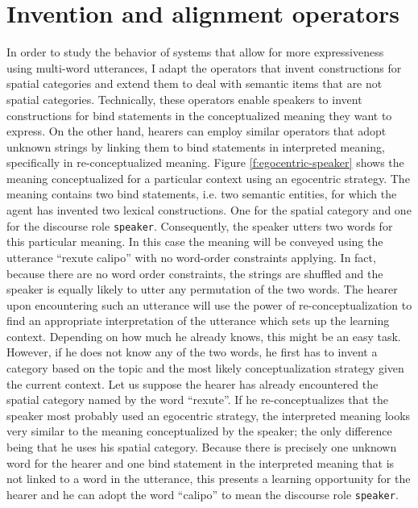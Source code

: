 \section{Invention and alignment operators}
In order to study the behavior of systems that allow for more expressiveness using 
multi-word utterances, I adapt the operators that invent constructions for spatial categories 
and extend them to deal with semantic items that are not spatial categories. 
Technically, these operators enable speakers to invent constructions for bind statements in the 
conceptualized meaning they want to express. On the other hand, hearers can employ 
similar operators that adopt unknown strings by linking them to bind statements in 
interpreted meaning, specifically in re-conceptualized meaning. 
Figure \ref{f:egocentric-speaker} shows the 
meaning conceptualized for a particular context using an egocentric strategy. The
meaning contains two bind statements, i.e. two semantic entities, for which the agent
has invented two lexical constructions. One for the spatial category and
one for the discourse role {\footnotesize\tt speaker}. Consequently, the speaker
utters two words for this particular meaning. In this case the meaning will be conveyed 
using the utterance ``rexute calipo'' with no word-order constraints applying. 
In fact, because there are no word order constraints, the strings are shuffled and the speaker 
is equally likely to utter any permutation of the two words. The hearer upon encountering such
an utterance will use the power of re-conceptualization to find an appropriate interpretation
of the utterance which sets up the learning context. Depending on how much he already knows, this might be an easy task. However, if he does not know any of the two words, 
he first has to invent a category based on the topic and the most likely conceptualization 
strategy given the current context.
Let us suppose the hearer has already encountered the spatial category named by the 
word ``rexute''. If he re-conceptualizes that the speaker most probably used an egocentric
strategy, the interpreted meaning looks very similar to the meaning conceptualized 
by the speaker; the only difference being that he uses his spatial category. 
Because there is precisely one unknown word for the hearer and one 
bind statement in the interpreted meaning
that is not linked to a word in the utterance, this presents a learning opportunity for the
hearer and he can adopt the word ``calipo'' to mean the discourse role {\footnotesize\tt speaker}.

